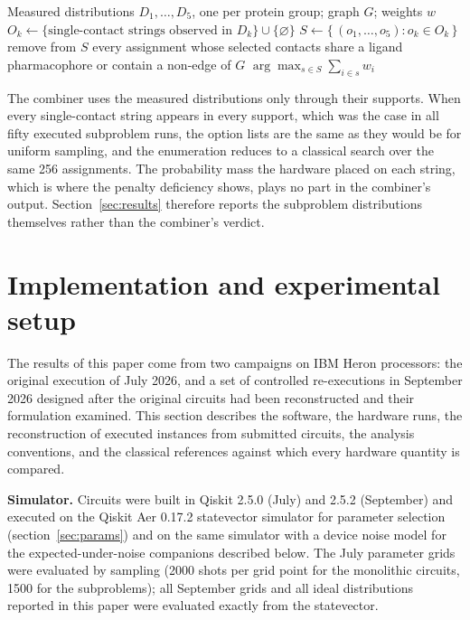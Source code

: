 \documentclass{iopjournal}
\begin{document}
\begin{algorithm}[htbp]
\caption{Full-enumeration combiner}
\label{alg:combiner}
\begin{algorithmic}[1]
\Require Measured distributions $D_1,\dots,D_5$, one per protein group; graph $G$; weights $w$
  \State $O_k \gets \{\text{single-contact strings observed in } D_k\} \cup \{\varnothing\}$
\EndFor
\State $S \gets \{\, (o_1,\dots,o_5) : o_k \in O_k \,\}$ 
\State remove from $S$ every assignment whose selected contacts share a ligand pharmacophore or contain a non-edge of $G$
\State \Return $\arg\max_{s \in S} \sum_{i \in s} w_i$
\end{algorithmic}
\end{algorithm}

The combiner uses the measured distributions only through their supports. When every single-contact string appears in every support, which was the case in all fifty executed subproblem runs, the option lists are the same as they would be for uniform sampling, and the enumeration reduces to a classical search over the same 256 assignments. The probability mass the hardware placed on each string, which is where the penalty deficiency shows, plays no part in the combiner's output. Section~\ref{sec:results} therefore reports the subproblem distributions themselves rather than the combiner's verdict.

\section{Implementation and experimental setup}
\label{sec:setup}

The results of this paper come from two campaigns on IBM Heron processors: the original execution of July 2026, and a set of controlled re-executions in September 2026 designed after the original circuits had been reconstructed and their formulation examined. This section describes the software, the hardware runs, the reconstruction of executed instances from submitted circuits, the analysis conventions, and the classical references against which every hardware quantity is compared.

\textbf{Simulator.} Circuits were built in Qiskit 2.5.0 (July) and 2.5.2 (September) and executed on the Qiskit Aer 0.17.2 statevector simulator for parameter selection (section~\ref{sec:params}) and on the same simulator with a device noise model for the expected-under-noise companions described below. The July parameter grids were evaluated by sampling (2000 shots per grid point for the monolithic circuits, 1500 for the subproblems); all September grids and all ideal distributions reported in this paper were evaluated exactly from the statevector.
\end{document}
